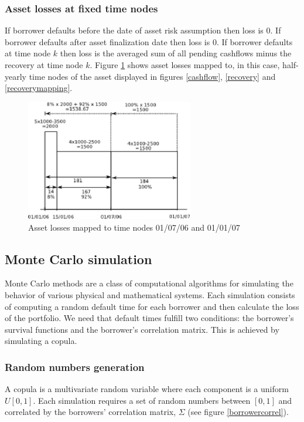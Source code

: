 \documentclass[a4paper,12pt,final]{article}
\begin{document}
\subsubsection{Asset losses at fixed time nodes}
If borrower defaults before the date of asset risk assumption then loss is $0$.
If borrower defaults after asset finalization date then loss is $0$. 
If borrower defaults at time node $k$ then loss is the averaged sum of all 
pending cashflows minus the recovery at time node $k$.
Figure \ref{lossesmapping} shows asset losses mapped to, in this case, half-yearly 
time nodes of the asset displayed in figures \ref{cashflow}, \ref{recovery} and 
\ref{recoverymapping}.

\begin{figure}[!hbtp]
\begin{center}
\includegraphics[width=7.34cm, angle=0]{./images/lossesmapping.eps}
\caption{Asset losses mapped to time nodes 01/07/06 and 01/01/07}
\label{lossesmapping}
\end{center}
\end{figure}
\FloatBarrier

\subsection{Monte Carlo simulation}
\label{mcsim}
Monte Carlo methods are a class of computational algorithms for 
simulating the behavior of various physical and mathematical systems. 
Each simulation consists of computing a random default time for each borrower and
then calculate the loss of the portfolio. We need that default times fulfill two 
conditions: the borrower's survival functions and the borrower's correlation matrix. 
This is achieved by simulating a copula. 

\subsubsection{Random numbers generation}
A copula \cite{copu:pitfalls} \cite{copu:wang} is a multivariate random variable 
where each component is a uniform $U[0,1]$. Each simulation requires a set of 
random numbers between $[0, 1]$ and correlated by the borrowers' correlation 
matrix, $\Sigma$ (see figure \ref{borrowercorrel}).
\end{document}

